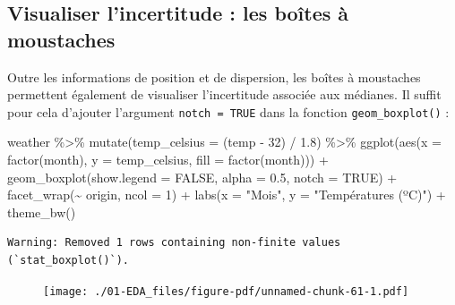 \documentclass[
  a4paper,
  DIV=11,
  numbers=noendperiod,
  oneside]{scrreprt}
\newenvironment{Shaded}{}{}
\newcommand{\AttributeTok}[1]{\textcolor[rgb]{0.84,0.23,0.29}{#1}}
\newcommand{\ConstantTok}[1]{\textcolor[rgb]{0.00,0.36,0.77}{#1}}
\newcommand{\DecValTok}[1]{\textcolor[rgb]{0.00,0.36,0.77}{#1}}
\newcommand{\FloatTok}[1]{\textcolor[rgb]{0.00,0.36,0.77}{#1}}
\newcommand{\FunctionTok}[1]{\textcolor[rgb]{0.44,0.26,0.76}{#1}}
\newcommand{\NormalTok}[1]{\textcolor[rgb]{0.14,0.16,0.18}{#1}}
\newcommand{\SpecialCharTok}[1]{\textcolor[rgb]{0.00,0.36,0.77}{#1}}
\newcommand{\StringTok}[1]{\textcolor[rgb]{0.01,0.18,0.38}{#1}}
\begin{document}
\hypertarget{visualiser-lincertitude-les-bouxeetes-uxe0-moustaches}{%
\subsection{Visualiser l'incertitude : les boîtes à
moustaches}\label{visualiser-lincertitude-les-bouxeetes-uxe0-moustaches}}

Outre les informations de position et de dispersion, les boîtes à
moustaches permettent également de visualiser l'incertitude associée aux
médianes. Il suffit pour cela d'ajouter l'argument
\texttt{notch\ =\ TRUE} dans la fonction \texttt{geom\_boxplot()} :

\begin{Shaded}
\begin{Highlighting}[]
\NormalTok{weather }\SpecialCharTok{\%\textgreater{}\%} 
  \FunctionTok{mutate}\NormalTok{(}\AttributeTok{temp\_celsius =}\NormalTok{ (temp }\SpecialCharTok{{-}} \DecValTok{32}\NormalTok{) }\SpecialCharTok{/} \FloatTok{1.8}\NormalTok{) }\SpecialCharTok{\%\textgreater{}\%} 
  \FunctionTok{ggplot}\NormalTok{(}\FunctionTok{aes}\NormalTok{(}\AttributeTok{x =} \FunctionTok{factor}\NormalTok{(month), }\AttributeTok{y =}\NormalTok{ temp\_celsius, }\AttributeTok{fill =} \FunctionTok{factor}\NormalTok{(month))) }\SpecialCharTok{+}
  \FunctionTok{geom\_boxplot}\NormalTok{(}\AttributeTok{show.legend =} \ConstantTok{FALSE}\NormalTok{, }\AttributeTok{alpha =} \FloatTok{0.5}\NormalTok{, }\AttributeTok{notch =} \ConstantTok{TRUE}\NormalTok{) }\SpecialCharTok{+}
  \FunctionTok{facet\_wrap}\NormalTok{(}\SpecialCharTok{\textasciitilde{}}\NormalTok{ origin, }\AttributeTok{ncol =} \DecValTok{1}\NormalTok{) }\SpecialCharTok{+}
  \FunctionTok{labs}\NormalTok{(}\AttributeTok{x =} \StringTok{"Mois"}\NormalTok{, }\AttributeTok{y =} \StringTok{"Températures (ºC)"}\NormalTok{) }\SpecialCharTok{+}
  \FunctionTok{theme\_bw}\NormalTok{()}
\end{Highlighting}
\end{Shaded}

\begin{verbatim}
Warning: Removed 1 rows containing non-finite values (`stat_boxplot()`).
\end{verbatim}

\begin{figure}[H]

{\centering \texttt{[image: ./01-EDA\_files/figure-pdf/unnamed-chunk-61-1.pdf]}

}

\end{figure}
\end{document}
